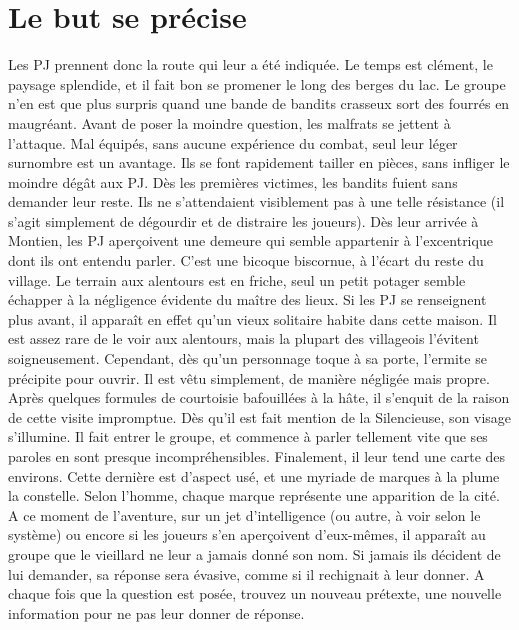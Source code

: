 \documentclass[a4paper, 11pt]{article}
\begin{document}
\section{Le but se précise}
Les PJ prennent donc la route qui leur a été indiquée. Le temps est clément, le paysage splendide, et il fait bon se promener le long des berges du lac. Le groupe n'en est que plus surpris quand une bande de bandits crasseux sort des fourrés en maugréant. Avant de poser la moindre question, les malfrats se jettent à l'attaque. Mal équipés, sans aucune expérience du combat, seul leur léger surnombre est un avantage. Ils se font rapidement tailler en pièces, sans infliger le moindre dégât aux PJ. Dès les premières victimes, les bandits fuient sans demander leur reste. Ils ne s'attendaient visiblement pas à une telle résistance (il s'agit simplement de dégourdir et de distraire les joueurs).
\newline
Dès leur arrivée à Montien, les PJ aperçoivent une demeure qui semble appartenir à l'excentrique dont ils ont entendu parler. C'est une bicoque biscornue, à l'écart du reste du village. Le terrain aux alentours est en friche, seul un petit potager semble échapper à la négligence évidente du maître des lieux. Si les PJ se renseignent plus avant, il apparaît en effet qu'un vieux solitaire habite dans cette maison. Il est assez rare de le voir aux alentours, mais la plupart des villageois l'évitent soigneusement. Cependant, dès qu'un personnage toque à sa porte, l'ermite se précipite pour ouvrir. Il est vêtu simplement, de manière négligée mais propre. Après quelques formules de courtoisie bafouillées à la hâte, il s'enquit de la raison de cette visite impromptue. Dès qu'il est fait mention de la Silencieuse, son visage s'illumine. Il fait entrer le groupe, et commence à parler tellement vite que ses paroles en sont presque incompréhensibles. Finalement, il leur tend une carte des environs. Cette dernière est d'aspect usé, et une myriade de marques à la plume la constelle. Selon l'homme, chaque marque représente une apparition de la cité. A ce moment de l'aventure, sur un jet d'intelligence (ou autre, à voir selon le système) ou encore si les joueurs s'en aperçoivent d'eux-mêmes, il apparaît au groupe que le vieillard ne leur a jamais donné son nom. Si jamais ils décident de lui demander, sa réponse sera évasive, comme si il rechignait à leur donner. A chaque fois que la question est posée, trouvez un nouveau prétexte, une nouvelle information pour ne pas leur donner de réponse.
\end{document}
